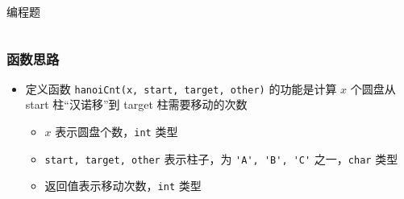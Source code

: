 \begin{frame}[fragile]
\begin{exampleblock}{编程题}
\begin{columns}
        \end{columns}
    \end{exampleblock}

\end{frame}

\begin{frame}[fragile]
    \frametitle{函数思路}
    
    \begin{itemize}
        \item 定义函数 \lstinline|hanoiCnt(x, start, target, other)| 的功能是计算 $x$ 个圆盘从 start 柱“汉诺移”到 target 柱需要移动的次数
        \begin{itemize}
            \item $x$ 表示圆盘个数，\lstinline|int| 类型
            \item \lstinline|start, target, other| 表示柱子，为 \lstinline|'A', 'B', 'C'| 之一，\lstinline|char| 类型
            \item 返回值表示移动次数，\lstinline|int| 类型
        \end{itemize}
    \end{itemize}

\end{frame}

